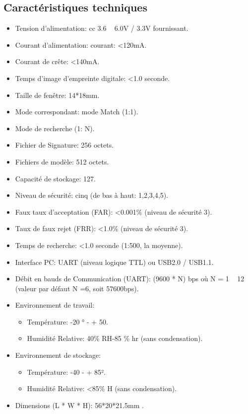 \subsection{Caractéristiques techniques }
    \begin{itemize}
        \item Tension d'alimentation: cc 3.6 ~ 6.0V / 3.3V fournissant.
        \item Courant d'alimentation: courant: <120mA.
        \item Courant de crête: <140mA.
        \item Temps d'image d'empreinte digitale: <1.0 seconde.
        \item Taille de fenêtre: 14*18mm.
        \item Mode correspondant: mode Match (1:1).
        \item Mode de recherche (1: N).
        \item Fichier de Signature: 256 octets.
        \item Fichiers de modèle: 512 octets.
        \item Capacité de stockage: 127.
        \item Niveau de sécurité: cinq (de bas à haut: 1,2,3,4,5).
        \item Faux taux d'acceptation (FAR): <0.001\% (niveau de sécurité 3).
        \item Taux de faux rejet (FRR): <1.0\% (niveau de sécurité 3).
        \item Temps de recherche: <1.0 seconde (1:500, la moyenne).
        \item Interface PC: UART (niveau logique TTL) ou USB2.0 / USB1.1.
        \item Débit en bauds de Communication (UART): (9600 * N) bps où N = 1 ~ 12 
        (valeur par défaut N =6, soit 57600bps).
        \item Environnement de travail:

        \begin{itemize}
            \item [\textbullet]Température: -20 ° - + 50.
            \item [\textbullet]Humidité Relative: 40\% RH-85 \% hr (sans condensation).
        \end{itemize}
        
        \item Environnement de stockage:

        \begin{itemize}
            \item [\textbullet] Température: -40 - + 85².
            \item [\textbullet] Humidité Relative: <85\% H (sans condensation).
        \end{itemize}

        \item Dimensions (L * W * H): 56*20*21.5mm .
    \end{itemize}
     

